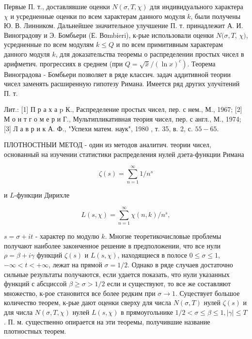 \documentclass[10pt]{article}
\begin{document}
Первые П. т., доставлявшие оценки $N(\sigma, T, \chi)$ для индивидуального характера $\chi$ и усредненные оценки по всем характерам данного модуля $k$, были получены Ю. В. Линником. Дальнейшее значительное улучшение П. т. принадлежит А. И. Виноградову и Э. Бомбьери (Е. Воmbieri), к-рые использовали оценки $N(\sigma, T$, $\chi)$, усредненные по всем модулям $k \leqslant Q$ и по всем примитивным характерам данного модуля $k$, для доказательства теоремы о распределении простых чисел в арифметич. прогрессиях в среднем (при $\left.Q=\sqrt{\bar{x}} /(\ln x)^{c}\right)$. Теорема Виноградова - Бомбьери позволяет в ряде классич. задач аддитивной теории чисел заменять расширенную гипотезу Римана. Имеется ряд других улучітений П. т.



Лит.: [1] П р а х а $\mathrm{p}$ К., Распределение простых чисел, пер. с нем., М., 1967; [2] М о н т г о м е р и Г., Мультипликативная теория чисел, пер. с англ., М., 1974; [3] Л а в р и к А. Ф., "Успехи матем. наук", 1980 , т. 35, в. 2, с. $55-65$.



ПЛОТНОСТНЫИ МЕТОД - один из методов аналитич. теории чисел, основанный на изучении статистики распределения нулей дзета-функции Римана



\[

\zeta(s)=\sum_{n=1}^{\infty} 1 / n^{s}

\]



и $L$-функции Дирихле



\[

L(s, \chi)=\sum_{n=1}^{\infty} \chi(n, k) / n^{s},

\]



$s=\sigma+i t$ - характер по модулю $k$. Многие теоретикочисловые проблемы получают наиболее законченное решение в предположении, что все нули $\rho=\beta+i \gamma$ функций $\zeta(s)$ и $L(s, \chi)$, находящиеся в полосе $0 \leqslant \sigma \leqslant 1$, $-\infty<t<+\infty$, лежат на прямой $\sigma=1 / 2$. Однако в ряде случаев достаточно сильные результаты получаются, если удается показать, что нули указанных функций с абсциссой $\beta \geqslant \sigma>1 / 2$ если и существуют, то все же составляют множество, к-рое становится все более редким при $\sigma \rightarrow 1$. Суцествует большое количество теорем, к-рые дают оценки сверху для числа $N(\sigma, T)$ нулей $\zeta(s)$ и для числа $N(\sigma, T, \chi)$ нулей $L(s, \chi)$ в прямоугольнике $1 / 2<\sigma \leqslant \beta \leqslant 1,|\gamma| \leqslant T$. П. м. существенно опирается на эти теоремы, получившие название плотностных теорем.
\end{document}
